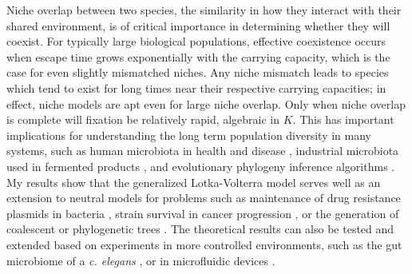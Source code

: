 Niche overlap between two species, the similarity in how they interact with their shared environment, is of critical importance in determining whether they will coexist. 
For typically large biological populations, effective coexistence occurs when escape time grows exponentially with the carrying capacity, which is the case for even slightly mismatched niches. 
Any niche mismatch leads to species which tend to exist for long times near their respective carrying capacities; in effect, niche models are apt even for large niche overlap. 
Only when niche overlap is complete will fixation be relatively rapid, algebraic in $K$. 
This has important implications for understanding the long term population diversity in many systems, such as human microbiota in health and disease \cite{Coburn2015,Palmer2001,Kinross2011}, industrial microbiota used in fermented products \cite{Wolfe2014}, and evolutionary phylogeny inference algorithms \cite{Rice2004,Blythe2007}. 
My results show that the generalized Lotka-Volterra model serves well as an extension to neutral models for problems such as maintenance of drug resistance plasmids in bacteria \cite{Gooding-townsend2015}, strain survival in cancer progression \cite{Ashcroft2015}, or the generation of coalescent or phylogenetic trees \cite{Kingman1982,Rice2004,Rogers2014}. 
The theoretical results can also be tested and extended based on experiments in more controlled environments, such as the gut microbiome of a \textit{c. elegans} \cite{Vega2017}, or in microfluidic devices \cite{Hung2005}. %


